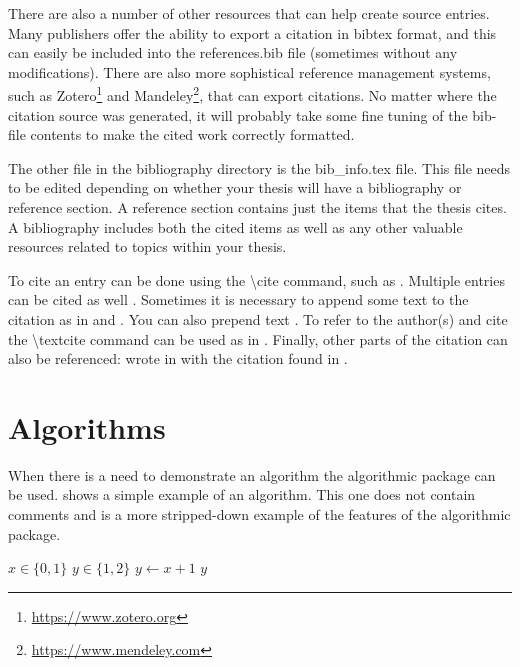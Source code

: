     There are also a number of other resources that can help create source entries.
    Many publishers offer the ability to export a citation in bibtex format, and this can easily be included into the references.bib file (sometimes without any modifications).
    There are also more sophistical reference management systems, such as Zotero\footnote{ \url{https://www.zotero.org}} and Mandeley\footnote{\url{https://www.mendeley.com}}, that can export citations.
    No matter where the citation source was generated, it will probably take some fine tuning of the bib-file contents to make the cited work correctly formatted.

    The other file in the bibliography directory is the bib\_info.tex file.
    This file needs to be edited depending on whether your thesis will have a bibliography or reference section.
    A reference section contains just the items that the thesis cites.
    A bibliography includes both the cited items as well as any other valuable resources related to topics within your thesis.

    To cite an entry can be done using the \textbackslash cite command, such as \cite{cpthesis_github}.
    Multiple entries can be cited as well \cite{drela1986a,dryden1943a,einstein1905,lopez2007a}.
    Sometimes it is necessary to append some text to the citation as in \cite[135]{dryden1943a} and \cite[section 2]{head1958a}.
    You can also prepend text \cite[such as][120]{Koutsovasilis2008}.
    To refer to the author(s) and cite the \textbackslash textcite command can be used as in \textcite{dirac1981}.
    Finally, other parts of the citation can also be referenced: \citeauthor{einstein1905} wrote  in \citeyear{einstein1905} with the citation found in \cite{einstein1905}.

\section{Algorithms} \label{sec:Algorithms}
    When there is a need to demonstrate an algorithm the algorithmic package can be used.
     shows a simple example of an algorithm.
    This one does not contain comments and is a more stripped-down example of the features of the algorithmic package.
    \begin{algorithm}
        \begin{algorithmic}
            \Require $x \in \{0,1\}$
            \Ensure $y \in \{1,2\}$
            \State $y \gets x+1$
            \State \Return $y$
        \end{algorithmic}
        \caption{Another algorithm.}
        \label{alg:SecondAlgorithm}
    \end{algorithm}

